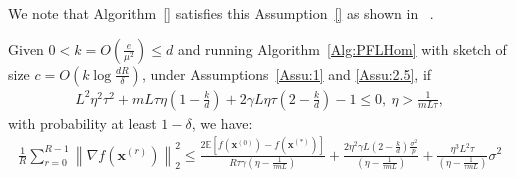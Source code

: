 We note that Algorithm~\ref{} satisfies this Assumption~\ref{} as shown in ~\cite{ivkin2019communication}.

\begin{theorem}
Given $0<k=O\left(\frac{e}{\mu^2}\right)\leq d$
and running Algorithm~\ref{Alg:PFLHom} with sketch of size $c=O\left(k\log \frac{d R}{\delta}\right)$,  under Assumptions~\ref{Assu:1} and \ref{Assu:2.5}, if 
\begin{align}
       L^2\eta^2\tau^2+mL\tau\eta\left(1-\frac{k}{d}\right)+2\gamma L\eta\tau\left(2-\frac{k}{d}\right)-1\leq 0,\:\eta> \frac{1}{mL\tau},\label{eq:cnd-lrs-h-ii} 
\end{align}
with probability at least $1-\delta$, we have:
\begin{align}
    \frac{1}{R}\sum_{r=0}^{R-1}\left\|\nabla f({\boldsymbol{x}}^{(r)})\right\|_2^2\leq \frac{2 \mathbb{E}\left[f({\boldsymbol{x}}^{(0)})-f({\boldsymbol{x}}^{(*)})\right]}{R\tau \gamma \left({\eta}-\frac{1}{\tau mL}\right)}+\frac{2\eta^2\gamma L\left(2-\frac{k}{d}\right)\frac{\sigma^2}{p}}{ \left({\eta}-\frac{1}{\tau mL}\right)}+\frac{\eta^3L^2\tau}{\left({\eta}-\frac{1}{\tau mL}\right)}\sigma^2 
\end{align}
\end{theorem}
\begin{remark}[$k=d$]
\end{remark}

